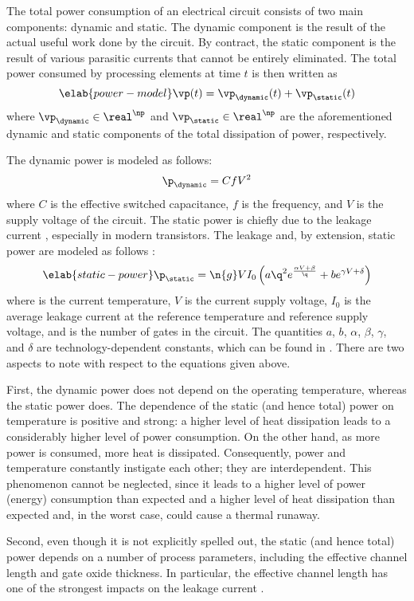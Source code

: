 The total power consumption of an electrical circuit consists of two main
components: dynamic and static. The dynamic component is the result of the
actual useful work done by the circuit. By contract, the static component is the
result of various parasitic currents that cannot be entirely eliminated. The
total power consumed by \np processing elements at time $t$ is then written as
\begin{equation} \elab{power-model}
  \vp(t) = \vp_\dynamic(t) + \vp_\static(t)
\end{equation}
where $\vp_\dynamic \in \real^\np$ and $\vp_\static \in \real^\np$ are the
aforementioned dynamic and static components of the total dissipation of power,
respectively.

The dynamic power is modeled as follows:
\[
  \p_\dynamic = C f V^2
\]
where $C$ is the effective switched capacitance, $f$ is the frequency, and $V$
is the supply voltage of the circuit. The static power is chiefly due to the
leakage current \cite{chandrakasan2000, srivastava2010, juan2011, juan2012},
especially in modern  transistors. The leakage and, by extension,
static power are modeled as follows \cite{liao2005}:
\begin{equation} \elab{static-power}
  \p_\static = \n{g} V I_0 \left(a \q^2 e^{\frac{\alpha V + \beta}{\q}} + b e^{\gamma V + \delta}\right)
\end{equation}
where \q is the current temperature, $V$ is the current supply voltage, $I_0$ is
the average leakage current at the reference temperature and reference supply
voltage, and  is the number of gates in the circuit. The quantities $a$,
$b$, $\alpha$, $\beta$, $\gamma$, and $\delta$ are technology-dependent
constants, which can be found in \cite{liao2005}. There are two aspects to note
with respect to the equations given above.

First, the dynamic power does not depend on the operating temperature, whereas
the static power does. The dependence of the static (and hence total) power on
temperature is positive and strong: a higher level of heat dissipation leads to
a considerably higher level of power consumption. On the other hand, as more
power is consumed, more heat is dissipated. Consequently, power and temperature
constantly instigate each other; they are interdependent. This phenomenon cannot
be neglected, since it leads to a higher level of power (energy) consumption
than expected and a higher level of heat dissipation than expected and, in the
worst case, could cause a thermal runaway.

Second, even though it is not explicitly spelled out, the static (and hence
total) power depends on a number of process parameters, including the effective
channel length and gate oxide thickness. In particular, the effective channel
length has one of the strongest impacts on the leakage current \cite{juan2012}.
